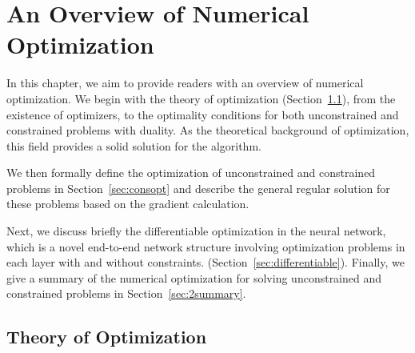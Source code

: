 \chapter{An Overview of Numerical Optimization}
\label{cha:overviewpart1}
In this chapter, we aim to provide readers with an overview of numerical optimization. We begin with the theory of optimization (Section~\ref{sec:theory}), from the existence of optimizers, to the optimality conditions for both unconstrained and constrained problems with duality. As the theoretical background of optimization, this field provides a solid solution for the algorithm. 
\par We then formally define the optimization of unconstrained and constrained problems in Section~\ref{sec:consopt} and describe the general regular solution for these problems based on the gradient calculation. 
\par Next, we discuss briefly the differentiable optimization in the neural network, which is a novel end-to-end network structure involving optimization problems in each layer with and without constraints. (Section~\ref{sec:differentiable}). Finally, we give a summary of the numerical optimization for solving unconstrained and constrained problems in Section~\ref{sec:2summary}.




\section{Theory of Optimization}
\label{sec:theory}
